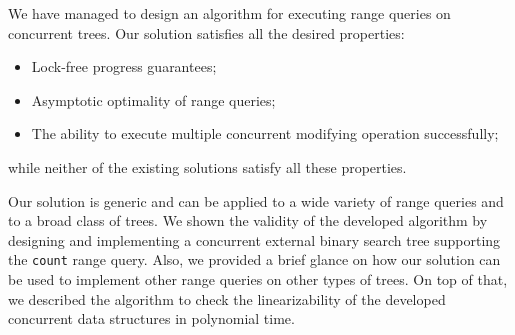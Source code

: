 \documentclass[times, dvipsnames,%
               languages={russian,english} %
              ]{itmo-student-thesis}
\begin{document}
\startconclusionpage

We have managed to design an algorithm for executing range queries on concurrent trees. Our solution satisfies all the desired properties:

\begin{itemize}
    \item Lock-free progress guarantees;
    
    \item Asymptotic optimality of range queries;
    
    \item The ability to execute multiple concurrent modifying operation successfully;
\end{itemize}

\bigbreak

while neither of the existing solutions satisfy all these properties. 

Our solution is generic and can be applied to a wide variety of range queries and to a broad class of trees. We shown the validity of the developed algorithm by designing and implementing a concurrent external binary search tree supporting the \texttt{count} range query. Also, we provided a brief glance on how our solution can be used to implement other range queries on other types of trees. On top of that, we described the algorithm to check the linearizability of the developed concurrent data structures in polynomial time.

\printmainbibliography
\end{document}
